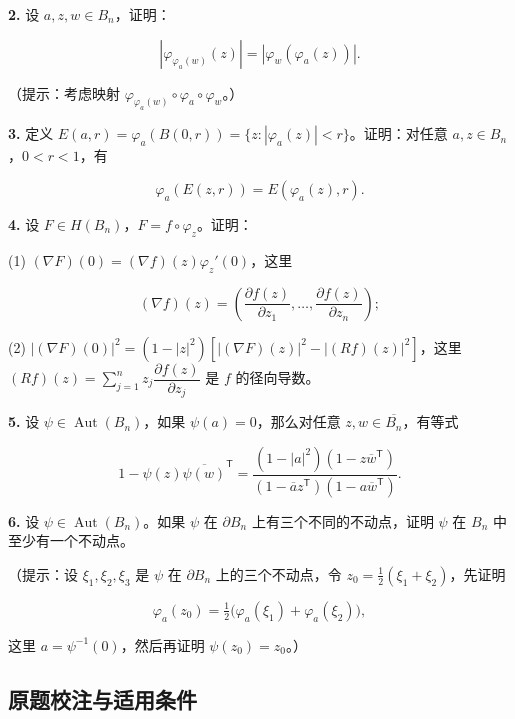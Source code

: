 \documentclass[11pt,a4paper]{article}
\begin{document}
\par{}
\noindent\textbf{2.} 设 \(a,z,w\in B_n\)，证明：

\[
|\varphi_{\varphi_a(w)}(z)|=|\varphi_w(\varphi_a(z))|.
\]

（提示：考虑映射
\(\varphi_{\varphi_a(w)}\circ\varphi_a\circ\varphi_w\)。）

\par{}
\noindent\textbf{3.} 定义
\(E(a,r)=\varphi_a(B(0,r))=\{z:|\varphi_a(z)|<r\}\)。证明：对任意
\(a,z\in B_n\)，\(0<r<1\)，有

\[
\varphi_a(E(z,r))=E(\varphi_a(z),r).
\]

\par{}
\noindent\textbf{4.} 设 \(F\in H(B_n)\)，\(F=f\circ\varphi_z\)。证明：

(1) \((\nabla F)(0)=(\nabla f)(z)\varphi_z'(0)\)，这里

\[
(\nabla f)(z)=\left(\frac{\partial f(z)}{\partial z_1},\ldots,\frac{\partial f(z)}{\partial z_n}\right);
\]

(2) \(|(\nabla F)(0)|^2=(1-|z|^2)[|(\nabla F)(z)|^2-|(Rf)(z)|^2]\)，这里
\((Rf)(z)=\sum_{j=1}^nz_j\dfrac{\partial f(z)}{\partial z_j}\) 是 \(f\)
的径向导数。

\par{}
\noindent\textbf{5.} 设 \(\psi\in\operatorname{Aut}(B_n)\)，如果
\(\psi(a)=0\)，那么对任意 \(z,w\in\overline{B_n}\)，有等式

\[
1-\psi(z)\overline{\psi(w)}^{\mathsf T}
=\frac{(1-|a|^2)(1-z\overline w^{\mathsf T})}
{(1-\overline a z^{\mathsf T})(1-a\overline w^{\mathsf T})}.
\]

\par{}
\noindent\textbf{6.} 设 \(\psi\in\operatorname{Aut}(B_n)\)。如果 \(\psi\) 在
\(\partial B_n\) 上有三个不同的不动点，证明 \(\psi\) 在 \(B_n\)
中至少有一个不动点。

（提示：设 \(\xi_1,\xi_2,\xi_3\) 是 \(\psi\) 在 \(\partial B_n\)
上的三个不动点，令 \(z_0=\tfrac12(\xi_1+\xi_2)\)，先证明

\[
\varphi_a(z_0)=\tfrac12\bigl(\varphi_a(\xi_1)+\varphi_a(\xi_2)\bigr),
\]

这里 \(a=\psi^{-1}(0)\)，然后再证明 \(\psi(z_0)=z_0\)。）

\subsection{原题校注与适用条件}\label{ch09-practice-heading-8}
\end{document}
